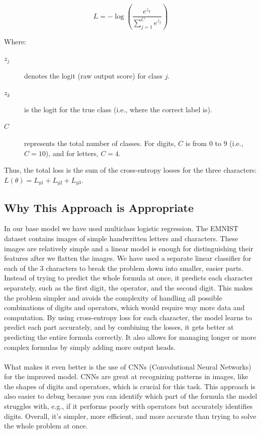 \documentclass{article}
\begin{document}
\begin{equation}
    L = -\log(\frac{e^{z_k}}{\sum_{j=1}^C e^{z_j}})
\end{equation}

Where:
\begin{description}
  \item[\hspace{1cm}\(z_j\)] denotes the logit (raw output score) for class \(j\).
  \item[\hspace{1cm}\(z_k\)] is the logit for the true class (i.e., where the correct label is).
  \item[\hspace{1cm}\(C\)] represents the total number of classes. For digits, \(C\) is from 0 to 9 (i.e., \(C = 10\)), and for letters, \(C = 4\).
\end{description}
Thus, the total loss is the sum of the cross-entropy losses for the three characters: \( L(\theta) = L_{y1} + L_{y2} + L_{y3} \).


\subsection{Why This Approach is Appropriate}
In our base model we have used multiclass logistic regression.
The EMNIST dataset contains images of simple handwritten letters and characters. These images are relatively simple and a linear model is enough for distinguishing their features after we flatten the images. We have used a separate linear classifier for each of the 3 characters to break the problem down into smaller, easier parts. Instead of trying to predict the whole formula at once, it predicts each character separately, such as the first digit, the operator, and the second digit. This makes the problem simpler and avoids the complexity of handling all possible combinations of digits and operators, which would require way more data and computation. By using cross-entropy loss for each character, the model learns to predict each part accurately, and by combining the losses, it gets better at predicting the entire formula correctly. It also allows for managing longer or more complex formulas by simply adding more output heads.
\\ \\
What makes it even better is the use of CNNs (Convolutional Neural Networks) for the improved model. CNNs are great at recognizing patterns in images, like the shapes of digits and operators, which is crucial for this task. This approach is also easier to debug because you can identify which part of the formula the model struggles with, e.g., if it performs poorly with operators but accurately identifies digits. Overall, it’s simpler, more efficient, and more accurate than trying to solve the whole problem at once.
 
\end{document}
